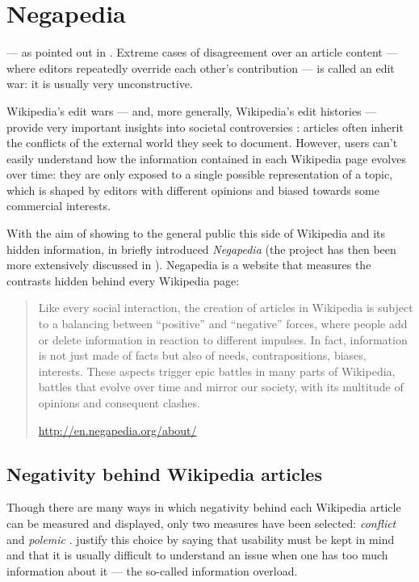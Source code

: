 \chapter{Negapedia}\label{negapedia}
     --- as \citeauthor{Sumi} pointed out in \cite{Sumi}.  Extreme cases of disagreement over an article content --- where editors repeatedly override each other's contribution --- is called an edit war: it is usually very unconstructive.
    
    Wikipedia's edit wars --- and, more generally, Wikipedia's edit histories --- provide very important insights into societal controversies \cite{Borra}: articles often inherit the conflicts of the external world they seek to document. However, users can't easily understand how the information contained in each Wikipedia page evolves over time: they are only exposed to a single possible representation of a topic, which is shaped by editors with different opinions and biased towards some commercial interests.
    
    With the aim of showing to the general public this  side of Wikipedia and its hidden information, in \citeyear{MarchioriNegapedia} \citeauthor{MarchioriNegapedia} briefly introduced \emph{Negapedia} \cite{MarchioriNegapedia} (the project has then been more extensively discussed in \cite{MarchioriBattle}). Negapedia is a website that measures the contrasts hidden behind every Wikipedia page: \blockquote[\url{http://en.negapedia.org/about/}]{Like every social interaction, the creation of articles in Wikipedia is subject to a balancing between “positive” and “negative” forces, where people add or delete information in reaction to different impulses. In fact, information is not just made of facts but also of needs, contrapositions, biases, interests. These aspects trigger epic battles in many parts of Wikipedia, battles that evolve over time and mirror our society, with its multitude of opinions and consequent clashes.}
    \section{Negativity behind Wikipedia articles}
        Though there are many ways in which negativity behind each Wikipedia article can be measured and displayed, only two measures have been selected: \emph{conflict} and \emph{polemic} \cite{MarchioriNegapedia}. \citeauthor{MarchioriNegapedia} justify this choice by saying that usability must be kept in mind and that it is usually difficult to understand an issue when one has too much information about it --- the so-called information overload.
